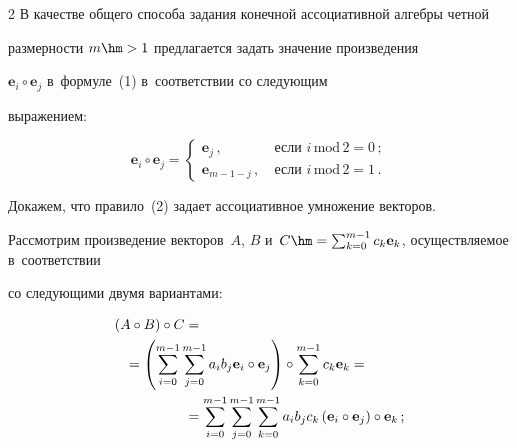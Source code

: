 \begin{multicols}{2}
  В качестве общего способа задания конечной ассоциативной алгебры четной 


размерности $m\hm>1$ предлагается задать значение произведения 


$\mathbf{e}_i\circ \mathbf{e}_j$ в~формуле~(1) в~соответствии со следующим 


выражением:


  \begin{equation}


  \mathbf{e}_i\circ\mathbf{e}_j=\begin{cases}


  \mathbf{e}_j\,, &\ \mbox{если } i\,\mathrm{mod}\,2=0\,;\\


  \mathbf{e}_{m-1-j}\,, &\ \mbox{если } i\,\mathrm{mod}\,2=1\,.


  \end{cases}


  \label{e2-f}


  \end{equation}


  


  Докажем, что правило~(2) задает ассоциативное умножение векторов. 


Рассмотрим произведение векторов~$A$, $B$ и~$C\hm= 


\sum\nolimits_{k=0}^{m-1} c_k\mathbf{e}_k$, осуществляемое в~соответствии 


со следующими двумя вариантами: 


  \begin{align}


(A\circ B)\circ C &=\notag{}\\


  &\hspace*{-15mm}{}= \left( \sum\limits_{i=0}^{m-1} \sum\limits_{j=0}^{m-1} a_i 


b_j \mathbf{e}_i\circ \mathbf{e}_j\right) \circ \sum\limits_{k=0}^{m-1} 


c_k\mathbf{e}_k ={}\notag\\


&{}= \sum\limits_{i=0}^{m-1} \sum\limits_{j=0}^{m-1} 


\sum\limits_{k=0}^{m-1} a_i b_j c_k \left( \mathbf{e}_i\circ \mathbf{e}_j 


\right)\circ \mathbf{e}_k\,;


  \label{e3.1-f}


  \\



\end{align}
\end{multicols}
